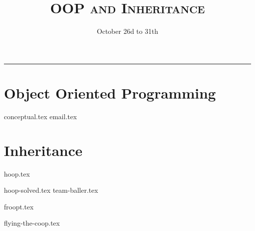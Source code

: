 \documentclass{exam}
\title{\textsc{OOP and Inheritance}}
\date{October 26d to 31th}
\begin{document}
\maketitle
\rule{\textwidth}{0.15em}
\fontsize{12}{15}\selectfont


\begin{questions}
\section{Object Oriented Programming}
{conceptual.tex}
\newpage
{email.tex}


\newpage
\section{Inheritance}

{hoop.tex}
\newpage

{hoop-solved.tex}
{team-baller.tex}
\newpage

{froopt.tex}
\newpage

{flying-the-coop.tex}
\newpage
\end{questions}
\end{document}
